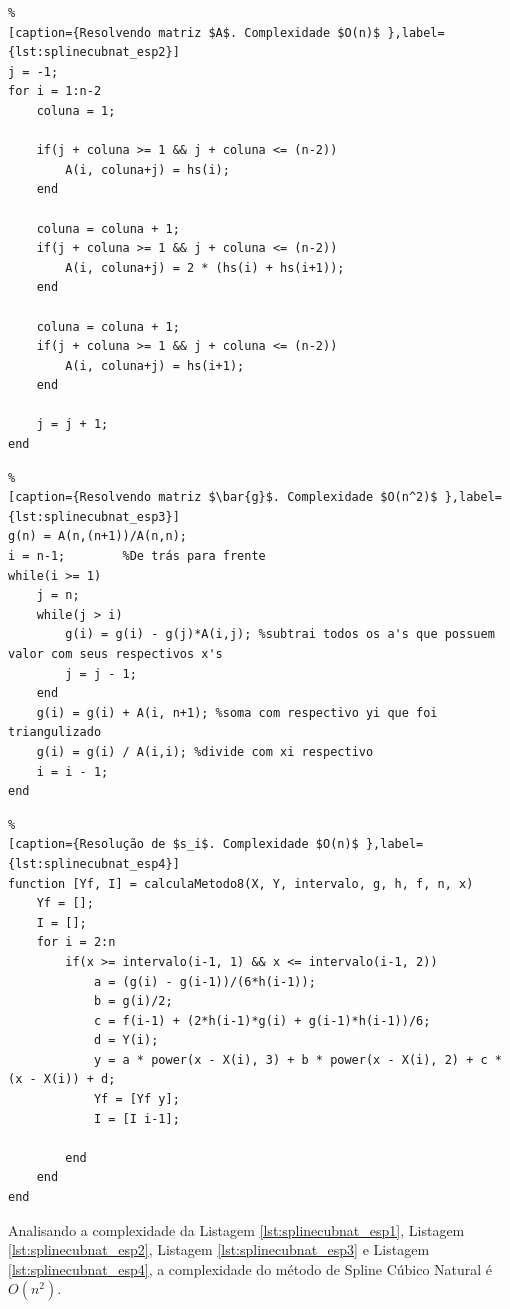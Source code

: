 \documentclass[conference]{IEEEtran}
\begin{document}
\begin{lstlisting}%
[caption={Resolvendo matriz $A$. Complexidade $O(n)$ },label={lst:splinecubnat_esp2}]
j = -1;
for i = 1:n-2
    coluna = 1;
    
    if(j + coluna >= 1 && j + coluna <= (n-2))
        A(i, coluna+j) = hs(i);
    end
    
    coluna = coluna + 1;
    if(j + coluna >= 1 && j + coluna <= (n-2))
        A(i, coluna+j) = 2 * (hs(i) + hs(i+1));
    end
    
    coluna = coluna + 1;
    if(j + coluna >= 1 && j + coluna <= (n-2))
        A(i, coluna+j) = hs(i+1);
    end
    
    j = j + 1;
end
\end{lstlisting}

\begin{lstlisting}%
[caption={Resolvendo matriz $\bar{g}$. Complexidade $O(n^2)$ },label={lst:splinecubnat_esp3}]
g(n) = A(n,(n+1))/A(n,n);
i = n-1;        %De trás para frente
while(i >= 1)
    j = n;
    while(j > i)
        g(i) = g(i) - g(j)*A(i,j); %subtrai todos os a's que possuem valor com seus respectivos x's
        j = j - 1;
    end
    g(i) = g(i) + A(i, n+1); %soma com respectivo yi que foi triangulizado
    g(i) = g(i) / A(i,i); %divide com xi respectivo
    i = i - 1;    
end
\end{lstlisting}

\begin{lstlisting}%
[caption={Resolução de $s_i$. Complexidade $O(n)$ },label={lst:splinecubnat_esp4}]
function [Yf, I] = calculaMetodo8(X, Y, intervalo, g, h, f, n, x)
    Yf = [];
    I = [];
    for i = 2:n
        if(x >= intervalo(i-1, 1) && x <= intervalo(i-1, 2))
            a = (g(i) - g(i-1))/(6*h(i-1));
            b = g(i)/2;
            c = f(i-1) + (2*h(i-1)*g(i) + g(i-1)*h(i-1))/6;
            d = Y(i);
            y = a * power(x - X(i), 3) + b * power(x - X(i), 2) + c * (x - X(i)) + d;
            Yf = [Yf y];
            I = [I i-1];

        end
    end
end
\end{lstlisting}
Analisando a complexidade da Listagem \ref{lst:splinecubnat_esp1}, Listagem \ref{lst:splinecubnat_esp2}, Listagem \ref{lst:splinecubnat_esp3} e Listagem \ref{lst:splinecubnat_esp4}, a complexidade do método de Spline Cúbico Natural é $O(n^2)$.
\end{document}
